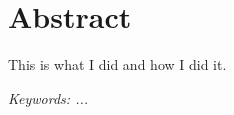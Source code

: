 \chapter{Abstract}
This is what I did and how I did it.
\vspace{1cm}

\noindent \textit{Keywords: ...}